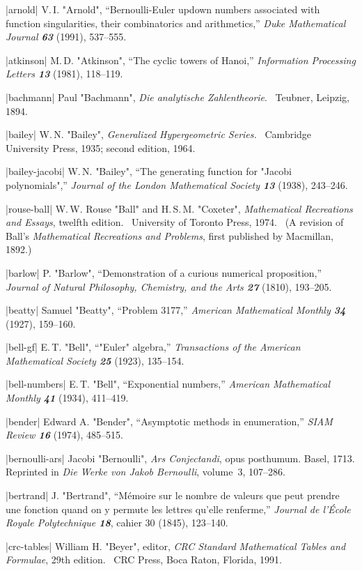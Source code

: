 \bib|arnold|%
V.\,I. "Arnold", ``Bernoulli-Euler updown numbers associated with function
singularities, their combinatorics and arithmetics,'' {\sl Duke
Mathematical Journal\/ \bf63} (1991), 537--555.

\bib|atkinson|%
M.\,D. "Atkinson", ``The cyclic towers of Hanoi,''
{\sl Information Processing Letters\/ \bf13} (1981), 118--119.

\bib|bachmann|%
Paul "Bachmann", {\sl Die analytische Zahlentheorie}. \
Teubner, Leipzig, 1894.

\bib|bailey|%
W.\,N. "Bailey", {\sl Generalized Hypergeometric Series.} \
Cambridge University Press, 1935; second edition, 1964.

\bib|bailey-jacobi|%
W.\,N. "Bailey", ``The generating function for "Jacobi polynomials",''
{\sl Journal of the London Mathematical Society\/ \bf13} (1938), 243--246.

\bib|rouse-ball|%
W.\,W. Rouse "Ball" and H.\,S.\,M. "Coxeter",
{\sl Mathematical Recreations and Essays}, twelfth edition. \
University of Toronto Press, 1974.
\ (A revision of Ball's {\sl Mathematical Recreations and Problems},
first published by Macmillan, 1892.)

\bib|barlow|%
P. "Barlow", ``Demonstration of a curious numerical proposition,''
{\sl Journal of Natural Philosophy, Chemistry, and the Arts\/ \bf27}
(1810), 193--205.

\bib|beatty|%
Samuel "Beatty", ``Problem 3177,'' {\sl American Mathematical Monthly\/
\bf 34} (1927), 159--160.

\bib|bell-gf|%
E.\,T. "Bell", ``"Euler" algebra,''
{\sl Transactions of the American Mathematical Society\/ \bf25} (1923),
 135--154.

\bib|bell-numbers|%
E.\,T. "Bell", ``Exponential numbers,''
{\sl American Mathematical Monthly\/ \bf41} (1934), 411--419.

\bib|bender|%
Edward A. "Bender", ``Asymptotic methods in enumeration,''
{\sl SIAM Review\/ \bf16} (1974), 485--515.

\bib|bernoulli-ars|%
Jacobi "Bernoulli", {\sl Ars Conjectandi}, opus posthumum.
Basel, 1713. Reprinted in {\sl Die Werke von Jakob Bernoulli}, volume~3,
107--286.

\bib|bertrand|%
J. "Bertrand", ``M\'emoire sur le nombre de valeurs que peut prendre une
fonction quand on y permute les lettres qu'elle renferme,''
{\sl Journal de l'\'Ecole Royale Polytechnique\/ \bf18}, cahier 30 (1845),
123--140.

\bib|crc-tables|%
William H. "Beyer", editor, {\sl CRC Standard Mathematical Tables and
Formulae}, 29th
edition. \ CRC Press, Boca Raton, Florida, 1991.

